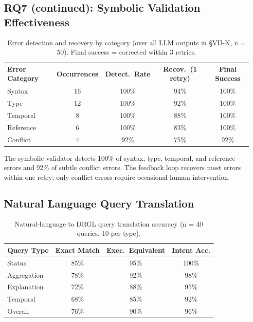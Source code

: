 \documentclass{ieeeaccess}
\begin{document}
\subsection{RQ7 (continued): Symbolic Validation Effectiveness}

\begin{table}[t]
\centering
\caption{Error detection and recovery by category (over all LLM outputs in §VII-K, n = 50). Final success = corrected within 3 retries.}
\label{tab:drgl_validation}
\begin{tabular}{lcccc}
\hline\hline
Error Category & Occurrences & Detect.\ Rate & Recov.\ (1 retry) & Final Success \\
\hline
Syntax     & 16 & 100\% & 94\% & 100\% \\
Type       & 12 & 100\% & 92\% & 100\% \\
Temporal   & 8  & 100\% & 88\% & 100\% \\
Reference  & 6  & 100\% & 83\% & 100\% \\
Conflict   & 4  & 92\%  & 75\% & 92\% \\
\hline\hline
\end{tabular}
\end{table}

The symbolic validator detects 100\% of syntax, type, temporal, and reference errors and 92\% of subtle conflict errors. The feedback loop recovers most errors within one retry; only conflict errors require occasional human intervention.

\subsection{Natural Language Query Translation}

\begin{table}[t]
\centering
\caption{Natural-language to DRGL query translation accuracy (n = 40 queries, 10 per type).}
\label{tab:drgl_nlq}
\begin{tabular}{lccc}
\hline\hline
Query Type & Exact Match & Exec.\ Equivalent & Intent Acc. \\
\hline
Status        & 85\% & 95\% & 100\% \\
Aggregation   & 78\% & 92\% & 98\% \\
Explanation   & 72\% & 88\% & 95\% \\
Temporal      & 68\% & 85\% & 92\% \\
\hline
Overall       & 76\% & 90\% & 96\% \\
\hline\hline
\end{tabular}
\end{table}
\end{document}
